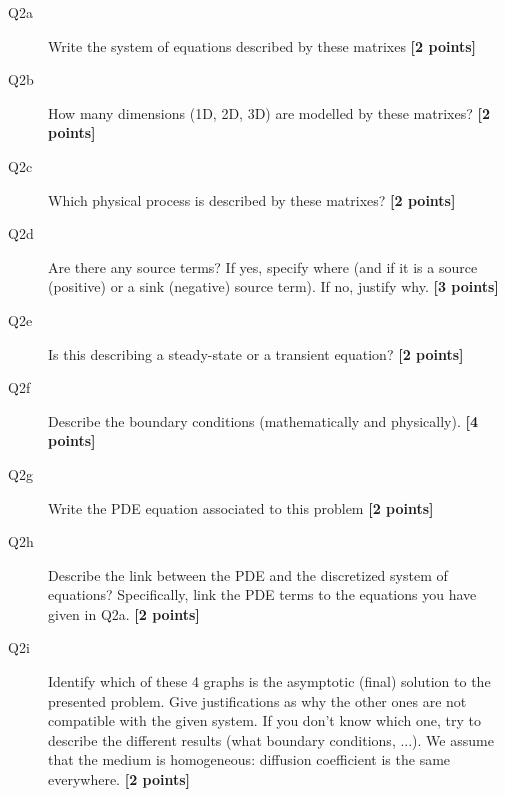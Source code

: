 \documentclass{article}
\begin{document}
\begin{description}
\item [Q2a] Write the system of equations described by these matrixes \textbf{[2 points]}
\vspace{5cm}

\item [Q2b] How many dimensions (1D, 2D, 3D) are modelled by these matrixes? \textbf{[2 points]}
\vspace{2cm}

\item [Q2c] Which physical process is described by these matrixes? \textbf{[2 points]}
\vspace{2cm}

\item [Q2d] Are there any source terms? If yes, specify where (and if it is a source (positive) or a sink (negative) source term). If no, justify why. \textbf{[3 points]}
\vspace{3cm}
\item [Q2e] Is this describing a steady-state or a transient equation? \textbf{[2 points]}
\vspace{2cm}

\item [Q2f] Describe the boundary conditions (mathematically and physically). \textbf{[4 points]}
\vspace{3.5cm}

\item [Q2g] Write the PDE equation associated to this problem \textbf{[2 points]}
\vspace{2cm}

\item [Q2h] Describe the link between the PDE and the discretized system of equations? Specifically, link the PDE terms to the equations you have given in Q2a. \textbf{[2 points]}
\vspace{3cm}

\item [Q2i] Identify which of these 4 graphs is the asymptotic (final) solution to the presented problem. Give justifications as why the other ones are not compatible with the given system. If you don't know which one, try to describe the different results (what boundary conditions, ...). We assume that the medium is homogeneous: diffusion coefficient is the same everywhere. \textbf{[2 points]}
\end{description}

\end{document}
